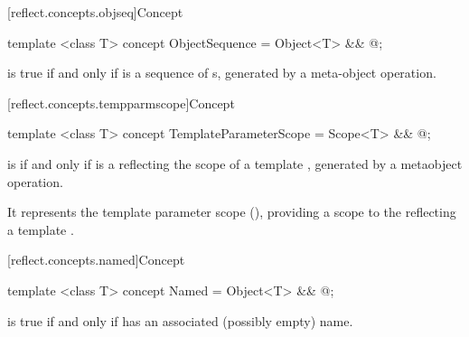 [reflect.concepts.objseq]{Concept }
\begin{std.txt}\color{addclr}

\begin{itemdecl}
template <class T> concept ObjectSequence = Object<T> && @\seebelow@;
\end{itemdecl}

\begin{itemdescr}
\pnum
{} is true if and only if  is a sequence of s, generated by a meta-object operation.

\end{itemdescr}
\end{std.txt}

[reflect.concepts.tempparmscope]{Concept }

\begin{std.txt}\color{addclr}

\begin{itemdecl}
template <class T> concept TemplateParameterScope = Scope<T> && @\seebelow@;
\end{itemdecl}

\begin{itemdescr}
\pnum
{} is  if and only if  is a  reflecting the scope of a template , generated by a metaobject operation. \begin{note} It represents the template parameter scope (), providing a scope to the  reflecting a template .\end{note}

\end{itemdescr}
\end{std.txt}

[reflect.concepts.named]{Concept }

\begin{std.txt}\color{addclr}

\begin{itemdecl}
template <class T> concept Named = Object<T> && @\seebelow@;
\end{itemdecl}

\begin{itemdescr}
\pnum
{} is true if and only if  has an associated (possibly empty) name.

\end{itemdescr}
\end{std.txt}

